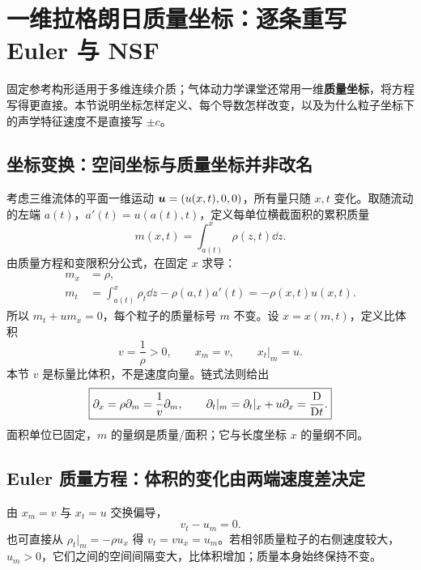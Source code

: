\section{一维拉格朗日质量坐标：逐条重写 Euler 与 NSF}\label{sec:mass-coordinate}

固定参考构形适用于多维连续介质；气体动力学课堂还常用一维\textbf{质量坐标}，将方程写得更直接。本节说明坐标怎样定义、每个导数怎样改变，以及为什么粒子坐标下的声学特征速度不是直接写 $\pm c$。

\subsection{坐标变换：空间坐标与质量坐标并非改名}

考虑三维流体的平面一维运动 $\bm{u}=(u(x,t),0,0)$，所有量只随 $x,t$ 变化。取随流动的左端 $a(t)$，$a'(t)=u(a(t),t)$，定义每单位横截面积的累积质量
\begin{equation}
 m(x,t)=\int_{a(t)}^x\rho(z,t)\dd z.
\end{equation}
由质量方程和变限积分公式，在固定 $x$ 求导：
\begin{align}
 m_x&=\rho,\\
 m_t&=\int_{a(t)}^x\rho_t\dd z-\rho(a,t)a'(t)
 =-\rho(x,t)u(x,t).
\end{align}
所以 $m_t+u m_x=0$，每个粒子的质量标号 $m$ 不变。设 $x=x(m,t)$，定义比体积
\begin{equation}
 v=\frac1\rho>0,\qquad
 x_m=v,\qquad x_t|_m=u.
\end{equation}
本节 $v$ 是标量比体积，不是速度向量。链式法则给出
\begin{equation}
 \boxed{\partial_x=\rho\partial_m=\frac1v\partial_m,
 \qquad \partial_t|_m=\partial_t|_x+u\partial_x=\frac{\mathrm D}{\mathrm Dt}.}
 \label{eq:mass-coordinate-derivatives}
\end{equation}
面积单位已固定，$m$ 的量纲是质量/面积；它与长度坐标 $x$ 的量纲不同。

\subsection{Euler 质量方程：体积的变化由两端速度差决定}

由 $x_m=v$ 与 $x_t=u$ 交换偏导，
\begin{equation}
 \boxed{v_t-u_m=0.}\label{eq:lag-mass}
\end{equation}
也可直接从 $\rho_t|_m=-\rho u_x$ 得 $v_t=v u_x=u_m$。若相邻质量粒子的右侧速度较大，$u_m>0$，它们之间的空间间隔变大，比体积增加；质量本身始终保持不变。

